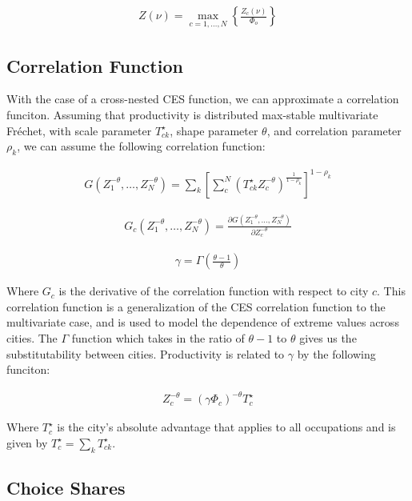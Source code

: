 \documentclass[10pt]{article}
\begin{document}
\begin{align}
    Z(\nu) = \max_{c = 1, \dots, N} \left\{\frac{Z_c(\nu)}{\Phi_o}\right\}
\end{align}

\subsection{Correlation Function}

With the case of a cross-nested CES function, we can approximate a correlation funciton. Assuming that productivity is distributed max-stable multivariate Fréchet, with scale parameter $T_{ck}^{\star}$, shape parameter $\theta$, and correlation parameter $\rho_k$, we can assume the following correlation function:

\begin{align}
    G (Z_1^{-\theta}, \dots, Z_N^{-\theta})= \sum_{k}^{} [\sum_{c}^{N} (T_{ck}^{\star} Z_c^{-\theta})^{\frac{1}{1 - \rho_k}}]^{1 - \rho_k}
\end{align}

\begin{align}
    G_c (Z_1^{-\theta}, \dots, Z_N^{-\theta}) = \frac{\partial G (Z_1^{-\theta}, \dots, Z_N^{-\theta})}{\partial Z_c^{-\theta}}
\end{align}

\begin{align}
    \gamma = \Gamma (\frac{\theta - 1}{\theta})
\end{align}

Where $G_c$ is the derivative of the correlation function with respect to city $c$. This correlation function is a generalization of the CES correlation function to the multivariate case, and is used to model the dependence of extreme values across cities. The $\Gamma$ function which takes in the ratio of $\theta - 1$ to $\theta$ gives us the substitutability between cities. Productivity is related to $\gamma$ by the following funciton:

\begin{align}
    Z_c^{-\theta} = (\gamma \Phi_c)^{-\theta} T_c^{\star}
\end{align}

Where $T_c^{\star}$ is the city's absolute advantage that applies to all occupations and is given by $T_c^{\star} = \sum_{k}^{} T_{ck}^{\star}$.

\subsection{Choice Shares}
\end{document}
